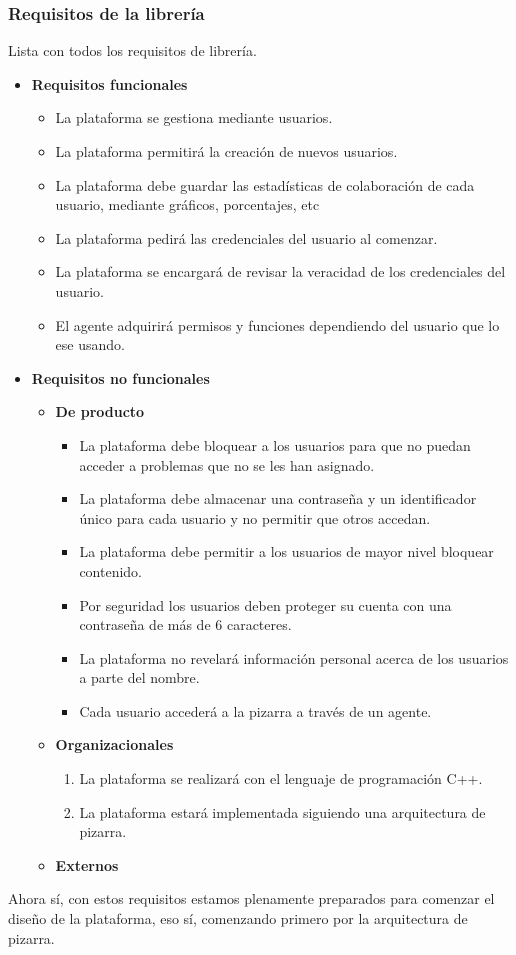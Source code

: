 \subsubsection{Requisitos de la librería}
Lista con todos los requisitos de librería.
\begin{itemize}
\item \textbf{Requisitos funcionales}
		\begin{itemize}
			\item La plataforma se gestiona mediante usuarios.
					\item La plataforma permitirá la creación de nuevos usuarios.
					\item La plataforma debe guardar las estadísticas de colaboración de cada usuario, mediante gráficos, porcentajes, etc
					\item La plataforma pedirá las credenciales del usuario al comenzar.
					\item La plataforma se encargará de revisar la veracidad de los credenciales del usuario.
					\item El agente adquirirá permisos y funciones dependiendo del usuario que lo ese usando.
		\end{itemize}
\item \textbf{Requisitos no funcionales}
		\begin{itemize}
			\item \textbf{De producto}
					\begin{itemize}
					\item La plataforma debe bloquear a los usuarios para que no puedan acceder a problemas que no se les han asignado.
					\item La plataforma debe almacenar una contraseña y un identificador único para cada usuario y no permitir que otros accedan.
					\item La plataforma debe permitir a los usuarios de mayor nivel bloquear contenido.
					\item Por seguridad los usuarios deben proteger su cuenta con una contraseña de más de 6 caracteres.
					\item La plataforma no revelará información personal acerca de los usuarios a parte del nombre.
					\item Cada usuario accederá a la pizarra a través de un agente.
					\end{itemize}
			\item \textbf{Organizacionales}
					\begin{enumerate}
						\item La plataforma se realizará con el lenguaje de programación C++.
						\item La plataforma estará implementada siguiendo una arquitectura de pizarra.
					\end{enumerate}
			\item \textbf{Externos}
		\end{itemize}
\end{itemize}



Ahora sí, con estos requisitos estamos plenamente preparados para comenzar el diseño de la plataforma, eso sí, comenzando primero por la arquitectura de pizarra.